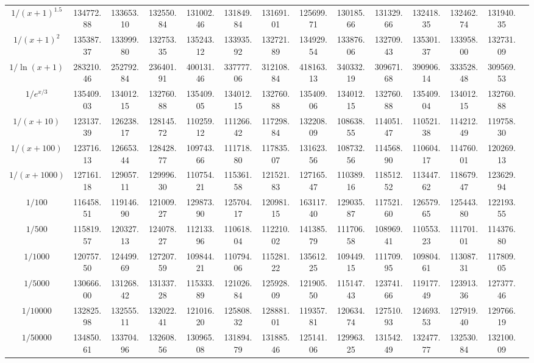 \documentclass[12pt, twoside]{article}
\begin{document}
\begin{table}
\begin{tabular}{c|ccc|ccc|ccc|cccc}
$1 / (x + 1)^{1.5}$ & 134772.88 & 133653.10 & 132550.84 & 131002.46 & 131849.84 & 131691.01 & 125699.71 & 130185.66 & 131329.66 & 132418.35 & 132462.74 & 131940.35 \\
$1 / (x + 1)^2$ & 135387.37 & 133999.80 & 132753.35 & 135243.12 & 133935.92 & 132721.89 & 134929.54 & 133876.06 & 132709.43 & 135301.37 & 133958.00 & 132731.09 \\
$1 / \ln(x + 1)$ & 283210.46 & 252792.84 & 236401.91 & 400131.46 & 337777.06 & 312108.84 & 418163.13 & 340332.19 & 309671.68 & 390906.14 & 333528.48 & 309569.53 \\
$1 / e^{x/3}$ & 135409.03 & 134012.15 & 132760.88 & 135409.05 & 134012.15 & 132760.88 & 135409.06 & 134012.15 & 132760.88 & 135409.04 & 134012.15 & 132760.88 \\
$1 / (x + 10)$ & 123137.39 & 126238.17 & 128145.72 & 110259.12 & 111266.42 & 117298.84 & 132208.09 & 108638.55 & 114051.47 & 110521.38 & 114212.49 & 119758.30 \\
$1 / (x + 100)$ & 123716.13 & 126653.44 & 128428.77 & 109743.66 & 111718.80 & 117835.07 & 131623.56 & 108732.56 & 114568.90 & 110604.17 & 114760.01 & 120269.13 \\
$1 / (x + 1000)$ & 127161.18 & 129057.11 & 129996.30 & 110754.21 & 115361.58 & 121521.83 & 127165.47 & 110389.16 & 118512.52 & 113447.62 & 118679.47 & 123629.94 \\
$1 / 100$ & 116458.51 & 119146.90 & 121009.27 & 129873.90 & 125704.17 & 120981.15 & 163117.40 & 129035.87 & 117521.60 & 126579.65 & 125443.80 & 122193.55 \\
$1 / 500$ & 115819.57 & 120327.13 & 124078.27 & 112133.96 & 110618.04 & 112210.02 & 141385.79 & 111706.58 & 108969.41 & 110553.23 & 111701.01 & 114376.80 \\
$1 / 1000$ & 120757.50 & 124499.69 & 127207.59 & 109844.21 & 110794.06 & 115281.22 & 135612.25 & 109449.15 & 111709.95 & 109804.61 & 113087.31 & 117809.05 \\
$1 / 5000$ & 130666.00 & 131268.42 & 131337.28 & 115333.89 & 121026.84 & 125928.09 & 121905.50 & 115147.43 & 123741.66 & 119177.49 & 123913.36 & 127377.46 \\
$1 / 10000$ & 132825.98 & 132555.11 & 132022.41 & 121016.20 & 125808.32 & 128881.01 & 119357.81 & 120634.74 & 127510.93 & 124693.53 & 127919.40 & 129766.19 \\
$1 / 50000$ & 134850.61 & 133704.96 & 132608.56 & 130965.08 & 131894.79 & 131885.46 & 125141.06 & 129963.25 & 131542.49 & 132477.77 & 132530.84 & 132100.09 \\
\bottomrule
\end{tabular}
\end{table}
\end{document}
